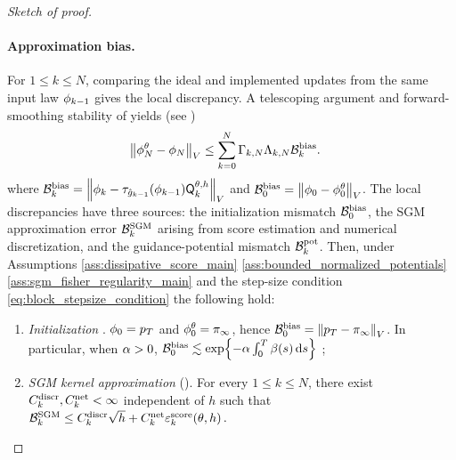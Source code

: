 \documentclass[11pt]{article}
\theoremstyle{plain}
\theoremstyle{definition}
\theoremstyle{remark}
\begin{document}
\begin{proof}[Sketch of proof]
\paragraph{Approximation bias.}
For $1\le k\le N$, comparing the ideal and implemented updates
from the same input law $\filter{k-1}$ gives the local discrepancy. A telescoping argument and forward-smoothing stability of  yields (see )
\begin{align*}
\vnorm[\approxfilter{N}-\filter{N}][V]
&\le \sum_{k=0}^{N}
\Gamma_{k,N}\Lambda_{k,N}\mathcal B_k^{\rm bias}.
\end{align*}
where $\mathcal B_k^{\rm bias} = \vnorm[ \filter{k} - \tau_{\approxpot{k-1}}(\filter{k-1})\mk{k}[\theta,h]
][V]$ and $\mathcal B_0^{\rm bias} = \vnorm[ \filter{0} - \approxfilter{0}]$. The local discrepancies have three sources: the initialization mismatch $\mathcal B_0^{\rm bias}$, the SGM approximation error $\mathcal B_k^{\rm SGM}$ arising from score estimation and numerical discretization, and the guidance-potential mismatch $\mathcal B_k^{\rm pot}$.
%
Then, under Assumptions \ref{ass:dissipative_score_main} \ref{ass:bounded_normalized_potentials}
\ref{ass:sgm_fisher_regularity_main} and the step-size condition \eqref{eq:block_stepsize_condition} the following hold:
%
\begin{enumerate}[leftmargin=*,label=(\roman*),itemsep=1pt]
\item \emph{Initialization}  \citep[Section H.1 in][]{strasman2026forgetting}. $\filter{0}=p_T$ and $\approxfilter{0}=\refmeas$, hence
$\mathcal B_0^{\rm bias} = \vnorm[p_T-\refmeas][V]$. In particular, when
$\alpha>0$, $\mathcal B_0^{\rm bias}
\lesssim \exp\!\left\{ -\alpha\int_0^T\beta(s)\,\mathrm{d} s \right\}$ ;

\item \emph{SGM kernel approximation} ().  For every $1\le k\le N$, there exist $C_k^{\rm discr},C_k^{\rm net}<\infty$ independent of $h$ such that
$\mathcal B_k^{\rm SGM} \le C_k^{\rm discr}\sqrt h + C_k^{\rm net}\varepsilon_k^{\rm score}(\theta,h) \,.$


\end{enumerate}
\end{proof}
\end{document}
